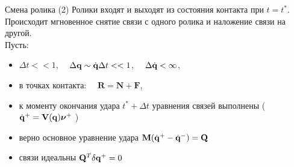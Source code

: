 \begin{frame}{Смена ролика}
    \textcolor{Periwinkle}{(2) Ролики входят и выходят из состояния контакта при $t = t^*$.}\\
    Происходит мгновенное снятие связи с одного ролика и наложение связи на другой.\\
    Пусть:
    \begin{itemize}
        \item $\Delta t << 1$, $\quad \Delta \mathbf{q} \sim \dot{\mathbf{q}}\Delta t << 1$, $\quad \Delta \dot{\mathbf{q}} < \infty$,
        \item в точках контакта: $\quad \mathbf{R} = \mathbf{N} + \mathbf{F}$,
        \item к моменту окончания удара $t^*+\Delta t$ уравнения связей выполнены (\enspace $\dot{\mathbf{q}}^+ = \mathbf{V}(\mathbf{q})\boldsymbol{\mathbf{\nu}}^+ \ $)
        \item верно основное уравнение удара \enspace $\mathbf{M} (\dot{\mathbf{q}}^+ - \dot{\mathbf{q}}^-) = \mathbf{Q}$
        \item связи идеальны \enspace $\mathbf{Q}^T\delta\mathbf{q}^+ = 0$
    \end{itemize}
\end{frame}
